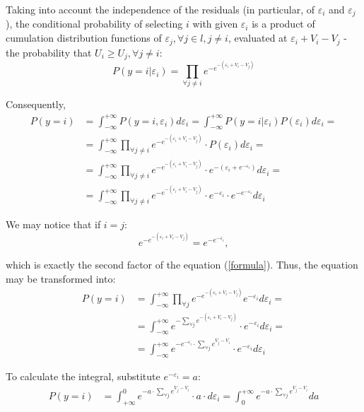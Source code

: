 \documentclass[a4paper, 12pt]{extreport}
\begin{document}
Taking into account the independence of the residuals (in particular, of $\varepsilon_i$ and $\varepsilon_j$), the conditional probability of selecting $i$ with given $\varepsilon_i$
is a product of cumulation distribution functions of $\varepsilon_j, \forall j \in l, j \neq i$, evaluated at $\varepsilon_i + V_i - V_j$ - the probability that $U_i \geq U_j, \forall j \neq i$:
\begin{equation}
	P(y = i | \varepsilon_i) = \prod_{\forall j \neq i} e^{-e^{-(\varepsilon_i + V_i - V_j)}}
\end{equation}

Consequently,
\begin{align}\label{formula}
	P(y = i) &= \int_{-\infty}^{+\infty}P(y = i, \varepsilon_i) d\varepsilon_i = \int_{-\infty}^{+\infty}P(y = i | \varepsilon_i) P(\varepsilon_i)d\varepsilon_i = \nonumber \\
	&= \int_{-\infty}^{+\infty}\prod_{\forall j \neq i} e^{-e^{-(\varepsilon_i + V_i - V_j)}} \cdot P(\varepsilon_i)d\varepsilon_i = \nonumber \\
	&= \int_{-\infty}^{+\infty}\prod_{\forall j \neq i} e^{-e^{-(\varepsilon_i + V_i - V_j)}} \cdot e^{-(\varepsilon_i + e^{-\varepsilon_i})} d\varepsilon_i = \nonumber \\
	&= \int_{-\infty}^{+\infty}\prod_{\forall j \neq i} e^{-e^{-(\varepsilon_i + V_i - V_j)}} \cdot e^{-\varepsilon_i} \cdot e^{-e^{-\varepsilon_i}} d\varepsilon_i
\end{align}

We may notice that if $i = j$:
\begin{equation}
	e^{-e^{-(\varepsilon_i + V_i - V_j)}} = e^{-e^{-\varepsilon_i}},
\end{equation}

which is exactly the second factor of the equation (\ref{formula}). Thus, the equation may be transformed into:
\begin{align}
	P(y = i) &= \int_{-\infty}^{+\infty}\prod_{\forall j}e^{-e^{-(\varepsilon_i + V_i - V_j)}}e^{-\varepsilon_i}d\varepsilon_i = \nonumber \\
	&= \int_{-\infty}^{+\infty} e^{-\sum_{\forall j}e^{-(\varepsilon_i + V_i - V_j)}} \cdot e^{-\varepsilon_i}d\varepsilon_i = \nonumber \\
	&= \int_{-\infty}^{+\infty} e^{-e^{-\varepsilon_i} \cdot \sum_{\forall j}e^{V_j - V_i}} \cdot e^{-\varepsilon_i}d\varepsilon_i
\end{align}

To calculate the integral, substitute $e^{-\varepsilon_i} = a$:
\begin{align}
	P(y = i) &= \int_{+\infty}^0 e^{-a \cdot \sum_{\forall j}e^{V_j - V_i}} \cdot a \cdot d\varepsilon_i = \int_{0}^{+\infty} e^{-a \cdot \sum_{\forall j}e^{V_j - V_i}} da
\end{align}
\end{document}
